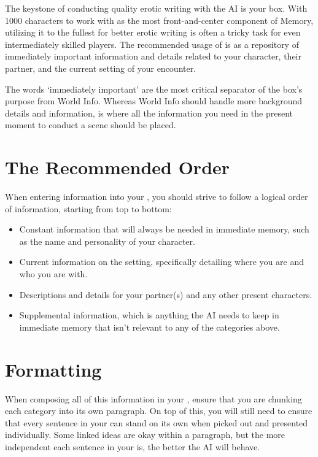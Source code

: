﻿\documentclass[Coomer-main.tex]{subfiles}
\begin{document}
The keystone of conducting quality erotic writing with the AI is your \rem box. With 1000 characters to work with as the most front-and-center component of Memory, utilizing it to the fullest for better erotic writing is often a tricky task for even intermediately skilled players. The recommended usage of \rem is as a repository of immediately important information and details related to your character, their partner, and the current setting of your encounter.

The words ‘immediately important’ are the most critical separator of the \rem box's purpose from World Info. Whereas World Info should handle more background details and information, \rem is where all the information you need in the present moment to conduct a scene should be placed.

\section{The Recommended Order}

When entering information into your \rem, you should strive to follow a logical order of information, starting from top to bottom:

\begin{itemize}
	
\item Constant information that will always be needed in immediate memory, such as the name and personality of your character.

\item Current information on the setting, specifically detailing where you are and who you are with.

\item Descriptions and details for your partner(s) and any other present characters.

\item Supplemental information, which is anything the AI needs to keep in immediate memory that isn't relevant to any of the categories above.

\end{itemize}

\section{Formatting}

When composing all of this information in your \rem, ensure that you are chunking each category into its own paragraph. On top of this, you will still need to ensure that every sentence in your \rem can stand on its own when picked out and presented individually. Some linked ideas are okay within a paragraph, but the more independent each sentence in your \rem is, the better the AI will behave.
\end{document}
